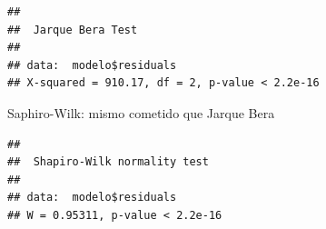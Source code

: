 \documentclass[]{article}
\newenvironment{Shaded}{\begin{snugshade}}{\end{snugshade}}
\newcommand{\KeywordTok}[1]{\textcolor[rgb]{0.13,0.29,0.53}{\textbf{#1}}}
\newcommand{\OperatorTok}[1]{\textcolor[rgb]{0.81,0.36,0.00}{\textbf{#1}}}
\newcommand{\NormalTok}[1]{#1}
\begin{document}
\begin{verbatim}
## 
##  Jarque Bera Test
## 
## data:  modelo$residuals
## X-squared = 910.17, df = 2, p-value < 2.2e-16
\end{verbatim}

Saphiro-Wilk: mismo cometido que Jarque Bera

\begin{Shaded}
\end{Shaded}

\begin{verbatim}
## 
##  Shapiro-Wilk normality test
## 
## data:  modelo$residuals
## W = 0.95311, p-value < 2.2e-16
\end{verbatim}
\end{document}
